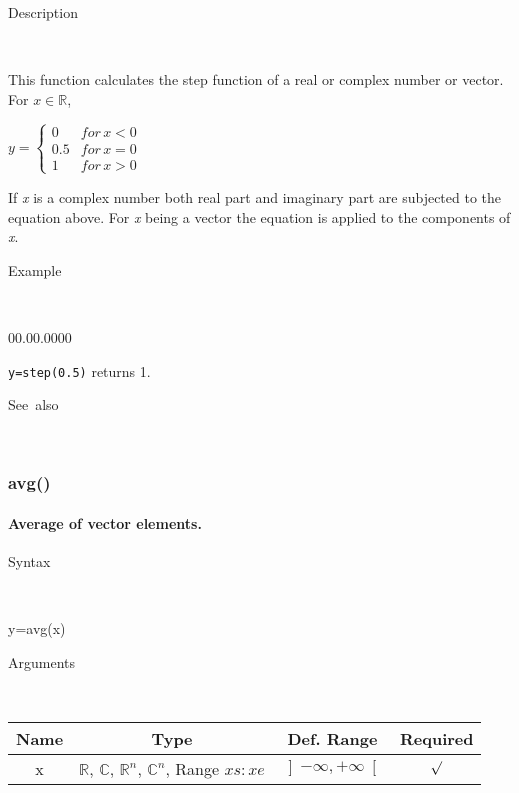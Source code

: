 \begin{description}
\item [Description]~
\end{description}
This function calculates the step function of a real or complex number
or vector. For $x\in\mathbb{R}$,

\medskip{}
$y=\left\{ \begin{array}{cc}
0 & for\, x<0\\
0.5 & for\, x=0\\
1 & for\, x>0\end{array}\right.$
\medskip{}

If \textit{x} is a complex number both real part and imaginary
part are subjected to the equation above. For \textit{x} being a vector
the equation is applied to the components of \textit{x}.

\begin{description}
\item [Example]~
\end{description}
\begin{lyxlist}{00.00.0000}
\item [\texttt{y=step(0.5)}]returns 1.
\end{lyxlist}
\begin{description}
\item [See~also]~
\end{description}

\newpage
{}




\subsubsection*{\hypertarget{avg}{}{\Large avg()}}


\paragraph{\label{par:Average}Average of vector elements.}

\begin{description}
\item [Syntax]~
\end{description}
y=avg(x)

\begin{description}
\item [Arguments]~
\end{description}
\begin{tabular}{|c|c|c|c|}
\hline 
Name&
Type&
Def. Range&
Required\tabularnewline
\hline
\hline 
x&
$\mathbb{R}$, $\mathbb{C}$, $\mathbb{R}^{n}$, $\mathbb{C}^{n}$,
Range $xs:xe$&
$\left]-\infty,+\infty\right[$&
$\surd$\tabularnewline
\hline
\end{tabular}

